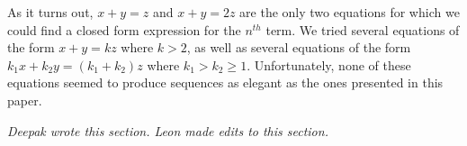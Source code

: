 \documentclass[11pt,letterpaper,twoside,english]{article}
\theoremstyle{theorem}
\theoremstyle{remark}
\begin{document}
As it turns out, $x+y=z$ and $x+y=2z$ are the only two equations for which we could find a closed form expression for the $n^{th}$ term. We tried several equations of the form $x+y=kz$ where $k>2$, as well as several equations of the form $k_1x+k_2y = (k_1 + k_2)z$ where $k_1 > k_2 \geq 1$. Unfortunately, none of these equations seemed to produce sequences as elegant as the ones presented in this paper.

\emph{Deepak wrote this section. Leon made edits to this section.}
\end{document}

